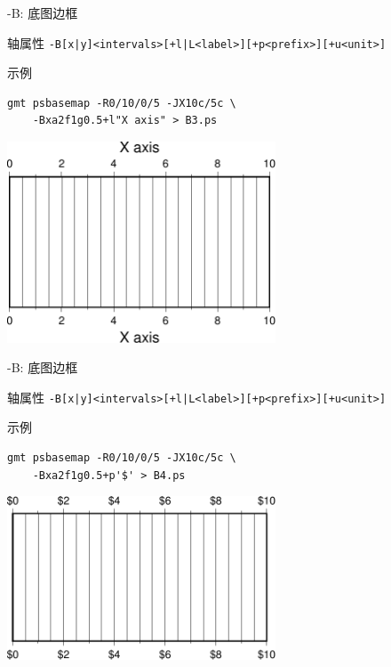 \documentclass[UTF8, 11pt]{ctexbeamer}
\begin{document}
\begin{frame}[fragile]{-B: 底图边框}
\begin{block}{轴属性}
\small{\verb!-B[x|y]<intervals>[+l|L<label>][+p<prefix>][+u<unit>]!}
\end{block}
\begin{block}{示例}
\centering
\small\begin{verbatim}
gmt psbasemap -R0/10/0/5 -JX10c/5c \
    -Bxa2f1g0.5+l"X axis" > B3.ps
\end{verbatim}
\includegraphics[width=0.6\textwidth]{GMT_B_example_3}
\end{block}
\end{frame}

\begin{frame}[fragile]{-B: 底图边框}
\begin{block}{轴属性}
\small{\verb!-B[x|y]<intervals>[+l|L<label>][+p<prefix>][+u<unit>]!}
\end{block}
\begin{block}{示例}
\centering
\small\begin{verbatim}
gmt psbasemap -R0/10/0/5 -JX10c/5c \
    -Bxa2f1g0.5+p'$' > B4.ps
\end{verbatim}
\includegraphics[width=0.6\textwidth]{GMT_B_example_4}
\end{block}
\end{frame}
\end{document}
